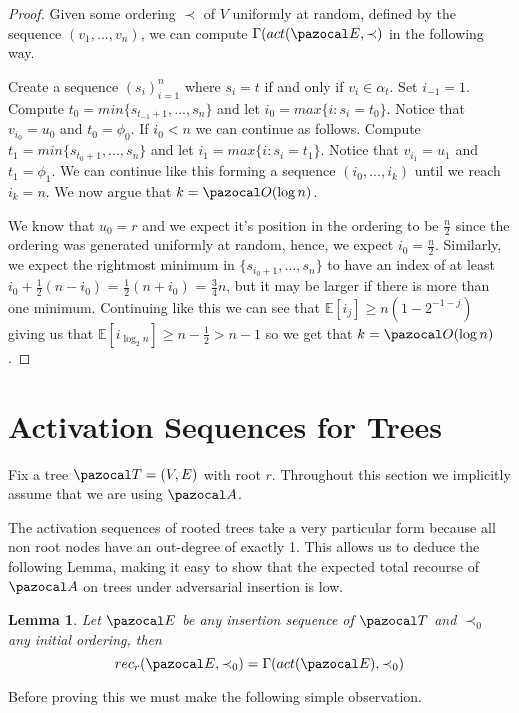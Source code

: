 \documentclass{article}
\newtheorem{lemma}[theorem]{Lemma}
\begin{document}
\begin{proof}
Given some ordering $\prec$ of $V$ uniformly at random, defined by the sequence $(v_1,...,v_n)$, we can compute $\Gamma(act(\pazocal E, \prec)$ in the following way.

Create a sequence $(s_i)_{i=1}^n$ where $s_i = t$ if and only if $v_i \in \alpha_t$. Set $i_{-1}=1$. Compute $t_0 = min\{s_{t_{-1}+1},...,s_n\}$ and let $i_0=max\{i:s_i=t_0\}$. Notice that $v_{i_0} = u_0$ and $t_0 = \phi_0$. If $i_0 < n$ we can continue as follows. Compute $t_1 = min\{s_{t_{0}+1},...,s_n\}$ and let $i_1=max\{i:s_i=t_1\}$. Notice that $v_{i_1} = u_1$ and $t_1 = \phi_1$. We can continue like this forming a sequence $(i_0,...,i_k)$ until we reach $i_k = n$. We now argue that $k = \pazocal O(\log n)$.

We know that $u_0 = r$ and we expect it's position in the ordering to be $\frac{n}{2}$ since the ordering was generated uniformly at random, hence, we expect $i_0 = \frac{n}{2}$. Similarly, we expect the rightmost minimum in $\{s_{i_0+1},...,s_n\}$ to have an index of at least $i_0 + \frac{1}{2}(n - i_0)$ = $\frac{1}{2}(n+i_0)$ = $\frac{3}{4}n$, but it may be larger if there is more than one minimum. Continuing like this we can see that $\mathbb{E}[i_j] \geq n(1-2^{-1-j})$ giving us that $\mathbb{E}[i_{\log_{2}n}] \geq n-\frac{1}{2} > n - 1$ so we get that $k = \pazocal O(\log n)$.
\end{proof}

\section{Activation Sequences for Trees}

Fix a tree $\pazocal T=(V,E)$ with root $r$. Throughout this section we implicitly assume that we are using $\pazocal A$.

The activation sequences of rooted trees take a very particular form because all non root nodes have an out-degree of exactly 1. This allows us to deduce the following Lemma, making it easy to show that the expected total recourse of $\pazocal A$ on trees under adversarial insertion is low.

\begin{lemma}
Let $\pazocal E$ be any insertion sequence of $\pazocal T$ and $\prec_0$ any initial ordering, then
\[ rec_r(\pazocal E, \prec_0) = \Gamma(act(\pazocal E), \prec_0) \]
\end{lemma}

Before proving this we must make the following simple observation.
\end{document}
